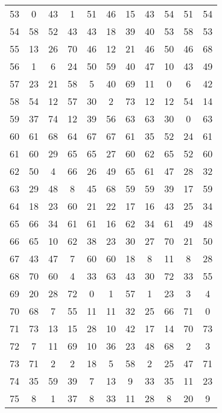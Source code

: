 \begin{table}
\begin{tabular}{c c c c c c c c c c c }
53 & 0 & 43 & 1 & 51 & 46 & 15 & 43 & 54 & 51 & 54 \\
54 & 58 & 52 & 43 & 43 & 18 & 39 & 40 & 53 & 58 & 53 \\
55 & 13 & 26 & 70 & 46 & 12 & 21 & 46 & 50 & 46 & 68 \\
56 & 1 & 6 & 24 & 50 & 59 & 40 & 47 & 10 & 43 & 49 \\
57 & 23 & 21 & 58 & 5 & 40 & 69 & 11 & 0 & 6 & 42 \\
58 & 54 & 12 & 57 & 30 & 2 & 73 & 12 & 12 & 54 & 14 \\
59 & 37 & 74 & 12 & 39 & 56 & 63 & 63 & 30 & 0 & 63 \\
60 & 61 & 68 & 64 & 67 & 67 & 61 & 35 & 52 & 24 & 61 \\
61 & 60 & 29 & 65 & 65 & 27 & 60 & 62 & 65 & 52 & 60 \\
62 & 50 & 4 & 66 & 26 & 49 & 65 & 61 & 47 & 28 & 32 \\
63 & 29 & 48 & 8 & 45 & 68 & 59 & 59 & 39 & 17 & 59 \\
64 & 18 & 23 & 60 & 21 & 22 & 17 & 16 & 43 & 25 & 34 \\
65 & 66 & 34 & 61 & 61 & 16 & 62 & 34 & 61 & 49 & 48 \\
66 & 65 & 10 & 62 & 38 & 23 & 30 & 27 & 70 & 21 & 50 \\
67 & 43 & 47 & 7 & 60 & 60 & 18 & 8 & 11 & 8 & 28 \\
68 & 70 & 60 & 4 & 33 & 63 & 43 & 30 & 72 & 33 & 55 \\
69 & 20 & 28 & 72 & 0 & 1 & 57 & 1 & 23 & 3 & 4 \\
70 & 68 & 7 & 55 & 11 & 11 & 32 & 25 & 66 & 71 & 0 \\
71 & 73 & 13 & 15 & 28 & 10 & 42 & 17 & 14 & 70 & 73 \\
72 & 7 & 11 & 69 & 10 & 36 & 23 & 48 & 68 & 2 & 3 \\
73 & 71 & 2 & 2 & 18 & 5 & 58 & 2 & 25 & 47 & 71 \\
74 & 35 & 59 & 39 & 7 & 13 & 9 & 33 & 35 & 11 & 23 \\
75 & 8 & 1 & 37 & 8 & 33 & 11 & 28 & 8 & 20 & 9 \\
\hline
\end{tabular}
\end{table}